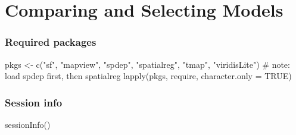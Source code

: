\documentclass[
  letterpaper,
  DIV=11,
  numbers=noendperiod]{scrreprt}
\newenvironment{Shaded}{\begin{snugshade}}{\end{snugshade}}
\newcommand{\AttributeTok}[1]{\textcolor[rgb]{0.40,0.45,0.13}{#1}}
\newcommand{\CommentTok}[1]{\textcolor[rgb]{0.37,0.37,0.37}{#1}}
\newcommand{\ConstantTok}[1]{\textcolor[rgb]{0.56,0.35,0.01}{#1}}
\newcommand{\FunctionTok}[1]{\textcolor[rgb]{0.28,0.35,0.67}{#1}}
\newcommand{\NormalTok}[1]{\textcolor[rgb]{0.00,0.23,0.31}{#1}}
\newcommand{\OtherTok}[1]{\textcolor[rgb]{0.00,0.23,0.31}{#1}}
\newcommand{\StringTok}[1]{\textcolor[rgb]{0.13,0.47,0.30}{#1}}
\begin{document}

\hypertarget{comparing-and-selecting-models}{%
\chapter{Comparing and Selecting
Models}\label{comparing-and-selecting-models}}

\newcommand{\Exp}{\mathrm{E}}
\newcommand\given[1][]{\:#1\vert\:}
\newcommand{\Cov}{\mathrm{Cov}}
\newcommand{\Var}{\mathrm{Var}}
\newcommand{\rank}{\mathrm{rank}}
\newcommand{\bm}[1]{\boldsymbol{\mathbf{#1}}}
\newcommand{\tr}{\mathrm{tr}}
\newcommand{\irow}[1]{%
\begin{pmatrix}#1\end{pmatrix}
}

\hypertarget{required-packages-9}{%
\subsection*{Required packages}\label{required-packages-9}}

\begin{Shaded}
\begin{Highlighting}[]
\NormalTok{pkgs }\OtherTok{\textless{}{-}} \FunctionTok{c}\NormalTok{(}\StringTok{"sf"}\NormalTok{, }\StringTok{"mapview"}\NormalTok{, }\StringTok{"spdep"}\NormalTok{, }\StringTok{"spatialreg"}\NormalTok{, }\StringTok{"tmap"}\NormalTok{, }\StringTok{"viridisLite"}\NormalTok{) }\CommentTok{\# note: load spdep first, then spatialreg}
\FunctionTok{lapply}\NormalTok{(pkgs, require, }\AttributeTok{character.only =} \ConstantTok{TRUE}\NormalTok{)}
\end{Highlighting}
\end{Shaded}

\hypertarget{session-info-9}{%
\subsection*{Session info}\label{session-info-9}}

\begin{Shaded}
\begin{Highlighting}[]
\FunctionTok{sessionInfo}\NormalTok{()}
\end{Highlighting}
\end{Shaded}
\end{document}
